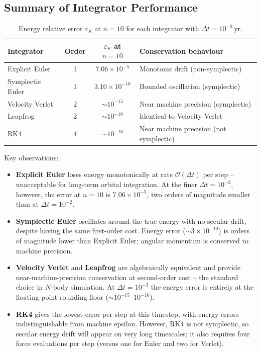 \subsection{Summary of Integrator Performance}

\begin{table}[H]
    \centering
    \begin{tabular}{l c c l}
        \hline
        Integrator & Order & $\varepsilon_E$ at $n=10$ & Conservation behaviour \\
        \hline
        Explicit Euler   & 1 & $7.06\times10^{-5}$ & Monotonic drift (non-symplectic) \\
        Symplectic Euler & 1 & $3.10\times10^{-10}$ & Bounded oscillation (symplectic) \\
        Velocity Verlet  & 2 & $\sim10^{-15}$      & Near machine precision (symplectic) \\
        Leapfrog         & 2 & $\sim10^{-16}$      & Identical to Velocity Verlet \\
        RK4              & 4 & $\sim10^{-16}$      & Near machine precision (not symplectic) \\
        \hline
    \end{tabular}
    \caption{Energy relative error $\varepsilon_E$ at $n = 10$ for each integrator with $\Delta t = 10^{-3}$\,yr.}
\end{table}

Key observations:

\begin{itemize}
    \item \textbf{Explicit Euler} loses energy monotonically at rate $\mathcal{O}(\Delta t)$ per step -- unacceptable for long-term orbital integration. At the finer $\Delta t = 10^{-3}$, however, the error at $n=10$ is $7.06\times10^{-5}$, two orders of magnitude smaller than at $\Delta t = 10^{-2}$.
    \item \textbf{Symplectic Euler} oscillates around the true energy with no secular drift, despite having the same first-order cost. Energy error ($\sim\!3\times10^{-10}$) is orders of magnitude lower than Explicit Euler; angular momentum is conserved to machine precision.
    \item \textbf{Velocity Verlet} and \textbf{Leapfrog} are algebraically equivalent and provide near-machine-precision conservation at second-order cost -- the standard choice in $N$-body simulation. At $\Delta t = 10^{-3}$ the energy error is entirely at the floating-point rounding floor ($\sim\!10^{-15}$--$10^{-16}$).
    \item \textbf{RK4} gives the lowest error per step at this timestep, with energy errors indistinguishable from machine epsilon. However, RK4 is not symplectic, so secular energy drift will appear on very long timescales; it also requires four force evaluations per step (versus one for Euler and two for Verlet).
\end{itemize}